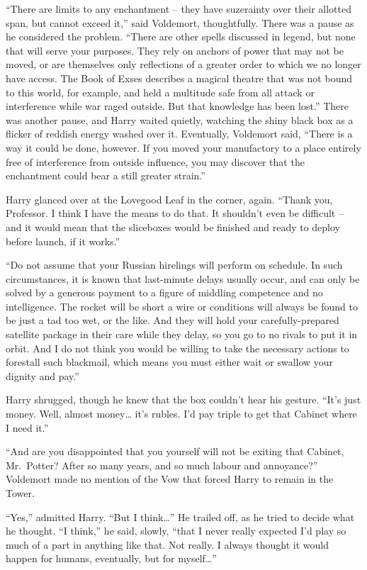 ``There are limits to any enchantment -- they have suzerainty over their
allotted span, but cannot exceed it,'' said Voldemort, thoughtfully.
There was a pause as he considered the problem. ``There are other spells
discussed in legend, but none that will serve your purposes. They rely
on anchors of power that may not be moved, or are themselves only
reflections of a greater order to which we no longer have access. The
Book of Exses describes a magical theatre that was not bound to this
world, for example, and held a multitude safe from all attack or
interference while war raged outside. But that knowledge has been
lost.'' There was another pause, and Harry waited quietly, watching the
shiny black box as a flicker of reddish energy washed over it.
Eventually, Voldemort said, ``There is a way it could be done, however.
If you moved your manufactory to a place entirely free of interference
from outside influence, you may discover that the enchantment could bear
a still greater strain.''

Harry glanced over at the Lovegood Leaf in the corner, again. ``Thank
you, Professor. I think I have the means to do that. It shouldn't even
be difficult -- and it would mean that the sliceboxes would be finished
and ready to deploy before launch, if it works.''

``Do not assume that your Russian hirelings will perform on schedule. In
such circumstances, it is known that last-minute delays usually occur,
and can only be solved by a generous payment to a figure of middling
competence and no intelligence. The rocket will be short a wire or
conditions will always be found to be just a tad too wet, or the like.
And they will hold your carefully-prepared satellite package in their
care while they delay, so you go to no rivals to put it in orbit. And I
do not think you would be willing to take the necessary actions to
forestall such blackmail, which means you must either wait or swallow
your dignity and pay.''

Harry shrugged, though he knew that the box couldn't hear his gesture.
``It's just money. Well, almost money\ldots{} it's rubles. I'd pay
triple to get that Cabinet where I need it.''

``And are you disappointed that you yourself will not be exiting that
Cabinet, Mr.~Potter? After so many years, and so much labour and
annoyance?'' Voldemort made no mention of the Vow that forced Harry to
remain in the Tower.

``Yes,'' admitted Harry. ``But I think\ldots{}'' He trailed off, as he
tried to decide what he thought. ``I think,'' he said, slowly, ``that I
never really expected I'd play so much of a part in anything like that.
Not really. I always thought it would happen for humans, eventually, but
for myself\ldots{}''

